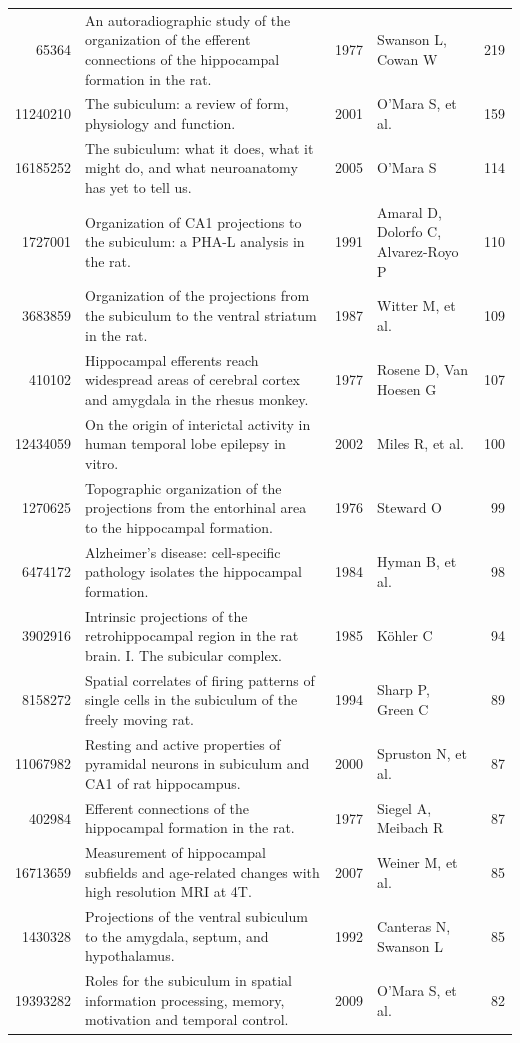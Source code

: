 \documentclass{../latex/analysis_report}
\begin{document}
\begin{longtable}{rp{6cm}lp{2.5cm}r}
65364 & An autoradiographic study of the organization of the efferent connections of the hippocampal formation in the rat. & 1977 & Swanson L, Cowan W & 219 \\
11240210 & The subiculum: a review of form, physiology and function. & 2001 & O'Mara S, et al. & 159 \\
16185252 & The subiculum: what it does, what it might do, and what neuroanatomy has yet to tell us. & 2005 & O'Mara S & 114 \\
1727001 & Organization of CA1 projections to the subiculum: a PHA-L analysis in the rat. & 1991 & Amaral D, Dolorfo C, Alvarez-Royo P & 110 \\
3683859 & Organization of the projections from the subiculum to the ventral striatum in the rat. & 1987 & Witter M, et al. & 109 \\
410102 & Hippocampal efferents reach widespread areas of cerebral cortex and amygdala in the rhesus monkey. & 1977 & Rosene D, Van Hoesen G & 107 \\
12434059 & On the origin of interictal activity in human temporal lobe epilepsy in vitro. & 2002 & Miles R, et al. & 100 \\
1270625 & Topographic organization of the projections from the entorhinal area to the hippocampal formation. & 1976 & Steward O & 99 \\
6474172 & Alzheimer's disease: cell-specific pathology isolates the hippocampal formation. & 1984 & Hyman B, et al. & 98 \\
3902916 & Intrinsic projections of the retrohippocampal region in the rat brain. I. The subicular complex. & 1985 & Köhler C & 94 \\
8158272 & Spatial correlates of firing patterns of single cells in the subiculum of the freely moving rat. & 1994 & Sharp P, Green C & 89 \\
11067982 & Resting and active properties of pyramidal neurons in subiculum and CA1 of rat hippocampus. & 2000 & Spruston N, et al. & 87 \\
402984 & Efferent connections of the hippocampal formation in the rat. & 1977 & Siegel A, Meibach R & 87 \\
16713659 & Measurement of hippocampal subfields and age-related changes with high resolution MRI at 4T. & 2007 & Weiner M, et al. & 85 \\
1430328 & Projections of the ventral subiculum to the amygdala, septum, and hypothalamus. & 1992 & Canteras N, Swanson L & 85 \\
19393282 & Roles for the subiculum in spatial information processing, memory, motivation and temporal control. & 2009 & O'Mara S, et al. & 82 \\

\end{longtable}
\end{document}
